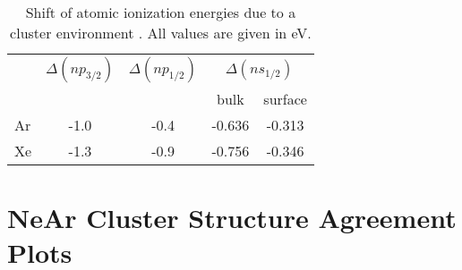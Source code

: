 \begin{appendix}
\begin{table}[h!]
 \caption{Shift of atomic ionization energies due to a cluster environment
          \cite{Feifel04}. All values are given in eV.}
 \centering
 \begin{tabular}{lcccc}
  \toprule
       & {$\Delta(np_{3/2})$} & {$\Delta(np_{1/2})$} & \multicolumn{2}{c}{$\Delta(ns_{1/2})$} \\
       &         &         & bulk    & surface \\
  \midrule
   Ar  & -1.0    & -0.4 & -0.636  & -0.313  \\
   Xe  & -1.3    & -0.9 & -0.756  & -0.346  \\
  \bottomrule
 \end{tabular}
 \label{table:cluster_shifts}
\end{table}







\chapter{NeAr Cluster Structure Agreement Plots}




\end{appendix}

